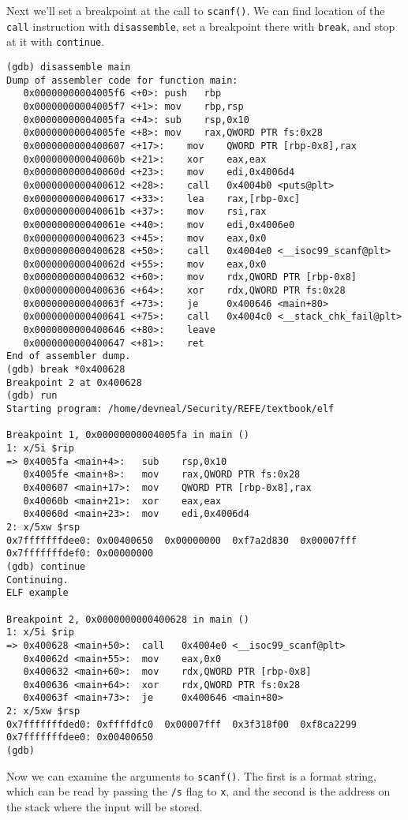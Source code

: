 Next we'll set a breakpoint at the call to \texttt{scanf()}. We can find
location of the \texttt{call} instruction with \texttt{disassemble}, set a
breakpoint there with \texttt{break}, and stop at it with \texttt{continue}.

\begin{lstlisting}
(gdb) disassemble main
Dump of assembler code for function main:
   0x00000000004005f6 <+0>:	push   rbp
   0x00000000004005f7 <+1>:	mov    rbp,rsp
   0x00000000004005fa <+4>:	sub    rsp,0x10
   0x00000000004005fe <+8>:	mov    rax,QWORD PTR fs:0x28
   0x0000000000400607 <+17>:	mov    QWORD PTR [rbp-0x8],rax
   0x000000000040060b <+21>:	xor    eax,eax
   0x000000000040060d <+23>:	mov    edi,0x4006d4
   0x0000000000400612 <+28>:	call   0x4004b0 <puts@plt>
   0x0000000000400617 <+33>:	lea    rax,[rbp-0xc]
   0x000000000040061b <+37>:	mov    rsi,rax
   0x000000000040061e <+40>:	mov    edi,0x4006e0
   0x0000000000400623 <+45>:	mov    eax,0x0
   0x0000000000400628 <+50>:	call   0x4004e0 <__isoc99_scanf@plt>
   0x000000000040062d <+55>:	mov    eax,0x0
   0x0000000000400632 <+60>:	mov    rdx,QWORD PTR [rbp-0x8]
   0x0000000000400636 <+64>:	xor    rdx,QWORD PTR fs:0x28
   0x000000000040063f <+73>:	je     0x400646 <main+80>
   0x0000000000400641 <+75>:	call   0x4004c0 <__stack_chk_fail@plt>
   0x0000000000400646 <+80>:	leave  
   0x0000000000400647 <+81>:	ret    
End of assembler dump.
(gdb) break *0x400628
Breakpoint 2 at 0x400628
(gdb) run
Starting program: /home/devneal/Security/REFE/textbook/elf 

Breakpoint 1, 0x00000000004005fa in main ()
1: x/5i $rip
=> 0x4005fa <main+4>:	sub    rsp,0x10
   0x4005fe <main+8>:	mov    rax,QWORD PTR fs:0x28
   0x400607 <main+17>:	mov    QWORD PTR [rbp-0x8],rax
   0x40060b <main+21>:	xor    eax,eax
   0x40060d <main+23>:	mov    edi,0x4006d4
2: x/5xw $rsp
0x7fffffffdee0:	0x00400650	0x00000000	0xf7a2d830	0x00007fff
0x7fffffffdef0:	0x00000000
(gdb) continue 
Continuing.
ELF example

Breakpoint 2, 0x0000000000400628 in main ()
1: x/5i $rip
=> 0x400628 <main+50>:	call   0x4004e0 <__isoc99_scanf@plt>
   0x40062d <main+55>:	mov    eax,0x0
   0x400632 <main+60>:	mov    rdx,QWORD PTR [rbp-0x8]
   0x400636 <main+64>:	xor    rdx,QWORD PTR fs:0x28
   0x40063f <main+73>:	je     0x400646 <main+80>
2: x/5xw $rsp
0x7fffffffded0:	0xffffdfc0	0x00007fff	0x3f318f00	0xf8ca2299
0x7fffffffdee0:	0x00400650
(gdb) 
\end{lstlisting}

Now we can examine the arguments to \texttt{scanf()}. The first is a format
string, which can be read by passing the \texttt{/s} flag to \texttt{x}, and the
second is the address on the stack where the input will be stored.

